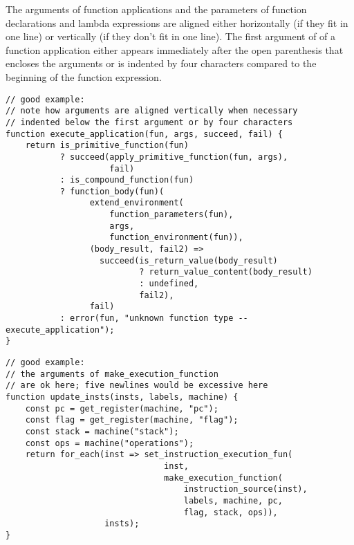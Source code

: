 The arguments of function applications and the parameters of function declarations
and lambda expressions are aligned either horizontally (if they fit in one line) or vertically
(if they don't fit in one line). The first argument of of a function application either
appears immediately after the open parenthesis that encloses the arguments or is
indented by four characters compared to the beginning of the function expression.
\newpage
\begin{lstlisting}
// good example:
// note how arguments are aligned vertically when necessary
// indented below the first argument or by four characters
function execute_application(fun, args, succeed, fail) {
    return is_primitive_function(fun)
           ? succeed(apply_primitive_function(fun, args),
                     fail)
           : is_compound_function(fun) 
           ? function_body(fun)(
                 extend_environment(
                     function_parameters(fun),
                     args,
                     function_environment(fun)),
                 (body_result, fail2) => 
                   succeed(is_return_value(body_result) 
                           ? return_value_content(body_result)
                           : undefined,
                           fail2),
                 fail)
           : error(fun, "unknown function type -- execute_application");
}
\end{lstlisting}

\begin{lstlisting}
// good example:
// the arguments of make_execution_function
// are ok here; five newlines would be excessive here
function update_insts(insts, labels, machine) {
    const pc = get_register(machine, "pc");
    const flag = get_register(machine, "flag");
    const stack = machine("stack");
    const ops = machine("operations");
    return for_each(inst => set_instruction_execution_fun(
                                inst,
                                make_execution_function(
                                    instruction_source(inst),
                                    labels, machine, pc,
                                    flag, stack, ops)),
                    insts);
}
\end{lstlisting}

